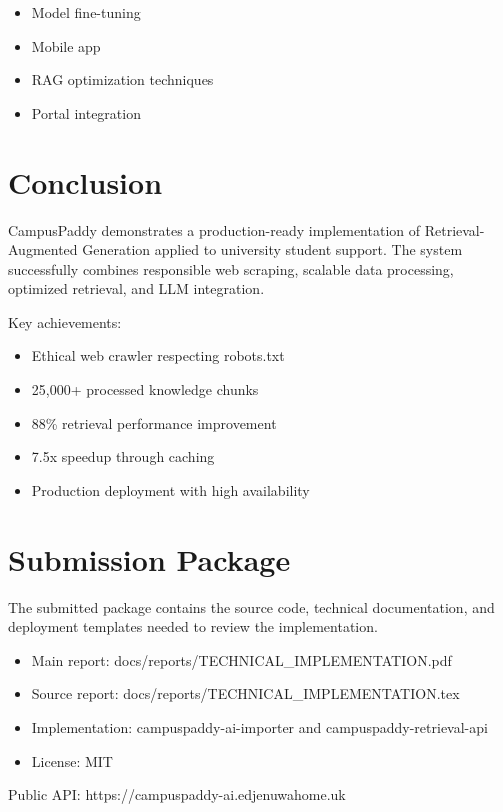 \documentclass[12pt]{article}
\begin{document}
\begin{itemize}
    \item Model fine-tuning
    \item Mobile app
    \item RAG optimization techniques
    \item Portal integration
\end{itemize}

\section{Conclusion}

CampusPaddy demonstrates a production-ready implementation of Retrieval-Augmented Generation applied to university student support. The system successfully combines responsible web scraping, scalable data processing, optimized retrieval, and LLM integration.

Key achievements:
\begin{itemize}
    \item Ethical web crawler respecting robots.txt
    \item 25,000+ processed knowledge chunks
    \item 88\% retrieval performance improvement
    \item 7.5x speedup through caching
    \item Production deployment with high availability
\end{itemize}

\section{Submission Package}

The submitted package contains the source code, technical documentation, and deployment templates needed to review the implementation.

\begin{itemize}
    \item Main report: docs/reports/TECHNICAL\_IMPLEMENTATION.pdf
    \item Source report: docs/reports/TECHNICAL\_IMPLEMENTATION.tex
    \item Implementation: campuspaddy-ai-importer and campuspaddy-retrieval-api
    \item License: MIT
\end{itemize}

Public API: https://campuspaddy-ai.edjenuwahome.uk
\end{document}
